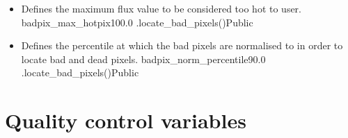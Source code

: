 \begin{itemize}
	\item {}
	{Defines the maximum flux value to be considered too hot to user.}
	{badpix\_max\_hotpix}{100.0}
	{\calbadpix}{\constantsfile}{\spirouImage.locate\_bad\_pixels()}{Public}

	\item {}
	{Defines the percentile at which the bad pixels are normalised to in order to locate bad and dead pixels.}
	{badpix\_norm\_percentile}{90.0}
	{\calbadpix}{\constantsfile}{\spirouImage.locate\_bad\_pixels()}{Public}


\end{itemize}









\clearpage
\newpage
\section{Quality control variables}
\label{ch:variables:qualitycontrol}

